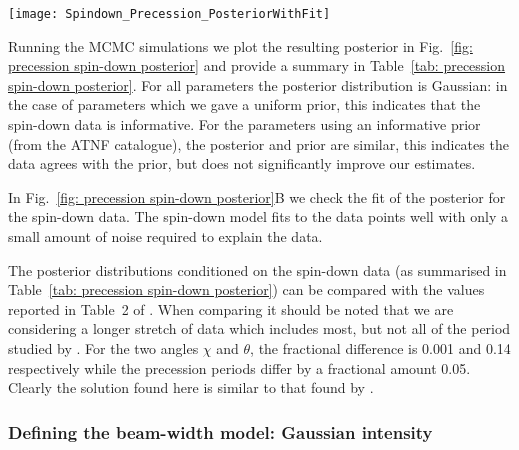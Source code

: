 \documentclass[../full_thesis/full_thesis.tex]{subfiles}
\newcommand{\thisdir}{../comparing_periodic_modulations}
\begin{document}
\begin{figure*}
\centering
\texttt{[image: Spindown\_Precession\_PosteriorWithFit]}
\caption{$\textbf{A}$: The estimated marginal posterior probability distribution for the
precession spin-down model parameters. For the secular spin-down
quantities, we show the difference with respect to the values as listed in
table~\ref{tab: ATNF}.
$\textbf{B}$: Checking the fit of the model using the
maximum posterior values to the data; see Fig.~\ref{fig: noise-only beam-width
posterior fit} for a complete description.}
\label{fig: precession spin-down posterior}
\end{figure*}
Running the MCMC simulations we plot the resulting
posterior in Fig.~\ref{fig: precession spin-down posterior} and provide a
summary in Table~\ref{tab: precession spin-down posterior}. For all parameters
the posterior distribution is Gaussian: in the case of parameters which we gave
a uniform prior, this indicates that the spin-down data is informative. For the
parameters using an informative prior (from the ATNF catalogue), the posterior
and prior are similar, this indicates the data agrees with the prior, but does
not significantly improve our estimates.
\begin{table}
\centering
\caption{Posterior estimates for the spin-down precession model. For the secular spin-down
quantities, we report the posterior difference with respect to the values as listed in
table~\ref{tab: ATNF}.}
\label{tab: precession spin-down posterior}

\end{table}

In Fig.~\ref{fig: precession spin-down posterior}B we check the fit of the
posterior for the spin-down data. The spin-down model fits to the data points
well with only a small amount of noise required to explain the data.

The posterior distributions conditioned on the spin-down data (as summarised in
Table~\ref{tab: precession spin-down posterior}) can be compared with the
values reported in Table~2 of \citet{Link2001}. When comparing it should be
noted that we are considering a longer stretch of data which includes most, but
not all of the period studied by \citet{Link2001}. For the two angles $\chi$
and $\theta$, the fractional difference is 0.001 and 0.14 respectively while
the precession periods differ by a fractional amount 0.05. Clearly the solution found here
is similar to that found by \citet{Link2001}.

\subsubsection{Defining the beam-width model: Gaussian intensity}
\end{document}
